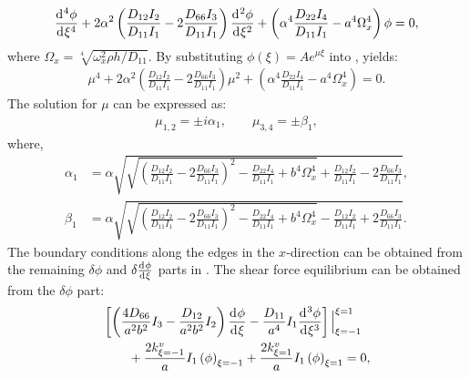\documentclass[preprint,12pt]{elsarticle}
\newcommand{\id}{\mathrm{d}\mkern1mu}
\begin{document}
%
\begin{equation}\label{eq:ODEx}
		\frac{\id^4 \phi}{\id \xi^4}+ 2\alpha^2\left(\frac{D_{12}I_2}{D_{11}I_1}-2\frac{D_{66}I_3}{D_{11}I_1}\right)\frac{\id^2 \phi}{\id \xi^2}+\left(\alpha^4\frac{D_{22}I_4}{D_{11}I_1}-a^4\Omega_x^4\right)\phi=0,
\end{equation}
%
where $\Omega_x = \sqrt[4]{\omega_x^2 \rho h / D_{11}}$.
By substituting $\phi(\xi) = A e^{\mu \xi}$ into , yields:
%
\begin{equation}\label{eq:ODEx2}
	\begin{split}
		\mu^4 + 2\alpha^2\left(\frac{D_{12}I_2}{D_{11}I_1}-2\frac{D_{66}I_3}{D_{11}I_1}\right)\mu^2 + \left(\alpha^4\frac{D_{22}I_4}{D_{11}I_1}-a^4\Omega_x^4\right) = 0.
	\end{split}
\end{equation}
%
The solution for $\mu$ can be expressed as:
%
\begin{equation}\label{eq:mu}
	\begin{split}
		\mu_{1,2} = \pm\textit{i} \alpha_1, \qquad \mu_{3,4} = \pm \beta_1,
	\end{split}
\end{equation}
%
where,
%
\begin{subequations}\label{eq:alphax}
	\begin{align}
		\alpha_1 &= \alpha \sqrt{\sqrt{\left(\frac{D_{12}I_2}{D_{11}I_1}-2\frac{D_{66}I_3}{D_{11}I_1}\right)^2 - \frac{D_{22}I_4}{D_{11}I_1} + b^4\Omega_x^4} + \frac{D_{12}I_2}{D_{11}I_1} - 2\frac{D_{66}I_3}{D_{11}I_1}},\label{eq:alphax1}\\
		\beta_1 &= \alpha \sqrt{\sqrt{\left(\frac{D_{12}I_2}{D_{11}I_1}-2\frac{D_{66}I_3}{D_{11}I_1}\right)^2 - \frac{D_{22}I_4}{D_{11}I_1} + b^4\Omega_x^4} - \frac{D_{12}I_2}{D_{11}I_1} + 2\frac{D_{66}I_3}{D_{11}I_1}}.\label{eq:alphax2}
	\end{align}
\end{subequations}
%
The boundary conditions along the edges in the $x$-direction can be obtained from the remaining $\delta \phi$ and $\delta \frac{\id \phi}{\id \xi}$ parts in . 
The shear force equilibrium can be obtained from the $\delta \phi$ part:
%
\begin{equation}\label{eq:inertial_forcex}
	\begin{split}
		&\left[ \left( \frac{4D_{66}}{a^2b^2} I_3 - \frac{D_{12}}{a^2b^2} I_2 \right) \frac{\id \phi}{\id \xi} 
		- \frac{D_{11}}{a^4} I_1 \frac{\id^3 \phi}{\id \xi^3} \right] \Big|^{\xi=1}_{\xi=-1}\\
		&\qquad+ \frac{2k^v_{\xi=-1}}{a} I_1 \left(\phi\right)_{\xi=-1}
		 + \frac{2k^v_{\xi=1}}{a} I_1 \left(\phi\right)_{\xi=1} = 0,
	\end{split}
\end{equation}
\end{document}

